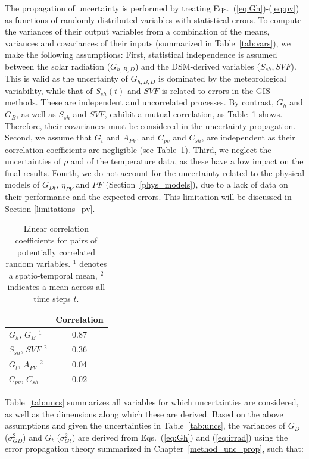 The propagation of uncertainty is performed by treating Eqs.~(\ref{eq:Gh})-(\ref{eq:pv}) as functions of randomly distributed variables with statistical errors. 
To compute the variances of their output variables from a combination of the means, variances and covariances of their inputs (summarized in Table~\ref{tab:vars}), we make the following assumptions:
First, statistical independence is assumed between the solar radiation ($G_{h, B, D}$) and the DSM-derived variables ($S_{sh}, SVF$). 
This is valid as the uncertainty of $G_{h, B, D}$ is dominated by the meteorological variability, while that of $S_{sh}(t)$ and $SVF$ is related to errors in the GIS methods. These are independent and uncorrelated processes. 
By contrast, $G_h$ and $G_B$, as well as $S_{sh}$ and $SVF$, exhibit a mutual correlation, as Table~\ref{tab:covrr} shows. Therefore, their covariances must be considered in the uncertainty propagation. 
Second, we assume that $G_t$ and $A_{PV}$, and $C_{pv}$ and $C_{sh}$, are independent as their correlation coefficients are negligible (see Table~\ref{tab:covrr}).
Third, we neglect the uncertainties of $\rho$ and of the temperature data, as these have a low impact on the final results.
Fourth, we do not account for the uncertainty related to the physical models of $G_{Dt}$, $\eta_{PV}$ and $PF$ (Section~\ref{phys_models}), due to a lack of data on their performance and the expected errors. This limitation will be discussed in Section \ref{limitations_pv}.

\begin{table}[tb]
\centering
\footnotesize
\caption{Linear correlation coefficients for pairs of potentially correlated random variables. $^1$ denotes a spatio-temporal mean, $^2$ indicates a mean across all time steps $t$.}
\label{tab:covrr}
\begin{tabular}{lc}
    \hline
                        & \textbf{Correlation}  \\ \hline
    $G_h$, $G_B$ $^1$    & 0.87                  \\
    $S_{sh}$, $SVF$ $^2$  & 0.36                  \\ 
    $G_t$, $A_{PV}$ $^2$  & 0.04                  \\
    $C_{pv}$, $C_{sh}$    & 0.02                  \\   \hline 
\end{tabular}
\end{table}

Table~\ref{tab:uncs} summarizes all variables for which uncertainties are considered, as well as the dimensions along which these are derived.
Based on the above assumptions and given the uncertainties in Table~\ref{tab:uncs}, the variances of $G_D$ ($\sigma^2_{GD}$) and $G_t$ ($\sigma^2_{Gt}$) are derived from Eqs.~(\ref{eq:Gh}) and (\ref{eq:irrad}) using the error propagation theory summarized in Chapter~\ref{method_unc_prop}, such that:

